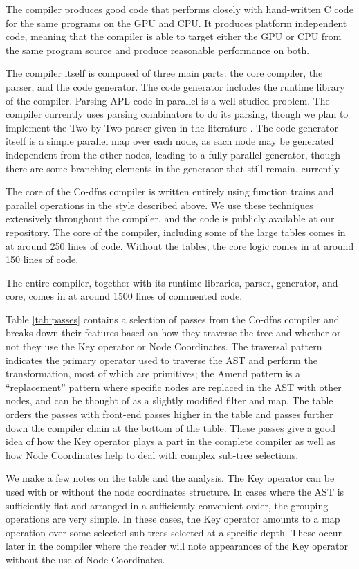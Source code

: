 ﻿\documentclass[numbers,10pt,preprint]{sigplanconf}
\begin{document}
The compiler produces good code that performs closely with hand-written C code for the same programs on the GPU and CPU. It produces platform independent code, meaning that the compiler is able to target either the GPU or CPU from the same program source and produce reasonable performance on both.

The compiler itself is composed of three main parts: the core compiler, the parser, and the code generator. The code generator includes the runtime library of the compiler. Parsing APL code in parallel is a well-studied problem. The compiler currently uses parsing combinators to do its parsing, though we plan to implement the Two-by-Two parser given in the literature \cite{bunda1984apl}. The code generator itself is a simple parallel map over each node, as each node may be generated independent from the other nodes, leading to a fully parallel generator, though there are some branching elements in the generator that still remain, currently.

The core of the Co-dfns compiler is written entirely using function trains and parallel operations in the style described above. We use these techniques extensively throughout the compiler, and the code is publicly available at our repository. The core of the compiler, including some of the large tables comes in at around 250 lines of code. Without the tables, the core logic comes in at around 150 lines of code.

The entire compiler, together with its runtime libraries, parser, generator, and core, comes in at around 1500 lines of commented code.

Table \ref{tab:passes} contains a selection of passes from the Co-dfns compiler and breaks down their features based on how they traverse the tree and whether or not they use the Key operator or Node Coordinates. The traversal pattern indicates the primary operator used to traverse the AST and perform the transformation, most of which are primitives; the Amend pattern is a ``replacement'' pattern where specific nodes are replaced in the AST with other nodes, and can be thought of as a slightly modified filter and map. The table orders the passes with front-end passes higher in the table and passes further down the compiler chain at the bottom of the table. These passes give a good idea of how the Key operator plays a part in the complete compiler as well as how Node Coordinates help to deal with complex sub-tree selections.

We make a few notes on the table and the analysis. The Key operator can be used with or without the node coordinates structure. In cases where the AST is sufficiently flat and arranged in a sufficiently convenient order, the grouping operations are very simple. In these cases, the Key operator amounts to a map operation over some selected sub-trees selected at a specific depth. These occur later in the compiler where the reader will note appearances of the Key operator without the use of Node Coordinates.
\end{document}
